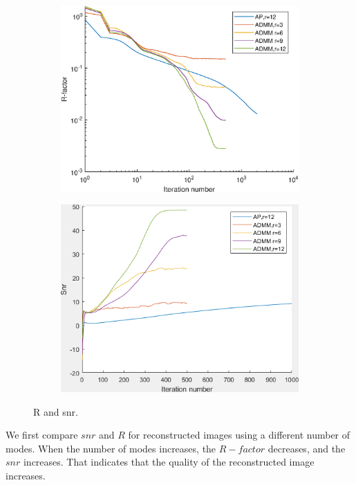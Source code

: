 \documentclass{article}
\numberwithin{equation}{section}
\begin{document}
 \begin{figure}[H]
 \begin{subfigure}{.5\textwidth}
    \centering
    \includegraphics[width=0.9\linewidth]{figures/modes_R.eps}  
    \label{fig:modes_R}
 \end{subfigure}
 \begin{subfigure}{.5\textwidth}
    \centering
    \includegraphics[width=.9\linewidth]{figures/modes_snr.png}  
    \label{fig:modes_snr}
 \end{subfigure}
 \caption{R and snr. }
 \label{fig:noise}
 \end{figure}


We first compare $snr$ and $R$ for reconstructed images using a different number of modes. When the number of modes increases, the $R-factor$ decreases, and the $snr$ increases. That indicates that the quality of the reconstructed image increases.
\end{document}
